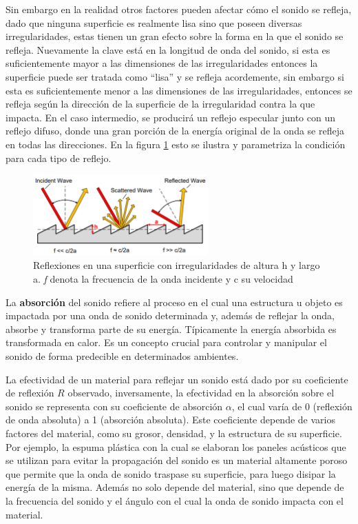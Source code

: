 \documentclass{prgrado}
\begin{document}
Sin embargo en la realidad otros factores pueden afectar cómo el sonido se refleja, dado que ninguna superficie es realmente lisa sino que poseen diversas irregularidades, estas tienen un gran efecto sobre la forma en la que el sonido se refleja. Nuevamente la clave está en la longitud de onda del sonido, si esta es suficientemente mayor a las dimensiones de las irregularidades entonces la superficie puede ser tratada como “lisa” y se refleja acordemente, sin embargo si esta es suficientemente menor a las dimensiones de las irregularidades, entonces se refleja según la dirección de la superficie de la irregularidad contra la que impacta. En el caso intermedio, se producirá un reflejo especular junto con un reflejo difuso, donde una gran porción de la energía original de la onda se refleja en todas las direcciones. En la figura \ref{fig:refleccion} esto se ilustra y parametriza la condición para cada tipo de reflejo.

\begin{figure}[h!]
    \centering
    \includegraphics[width=0.6\textwidth]{figs/wave-reflexion.png}
    \captionsetup{justification=centering}
    \caption{Reflexiones en una superficie con irregularidades de altura h y largo a. \newline\textit{f} denota la frecuencia de la onda incidente y c su velocidad}
    \label{fig:refleccion}
\end{figure}

La \textbf{absorción} del sonido refiere al proceso en el cual una estructura u objeto es impactada por una onda de sonido determinada y, además de reflejar la onda, absorbe y transforma parte de su energía. Típicamente la energía absorbida es transformada en calor. Es un concepto crucial para controlar y manipular el sonido de forma predecible en determinados ambientes.

La efectividad de un material para reflejar un sonido está dado por su coeficiente de reflexión $R$ observado, inversamente, la efectividad en la absorción sobre el sonido se representa con su coeficiente de absorción $\alpha$, el cual varía de 0 (reflexión de onda absoluta) a 1 (absorción absoluta). Este coeficiente depende de varios factores del material, como su grosor, densidad, y la estructura de su superficie. Por ejemplo, la espuma plástica con la cual se elaboran los paneles acústicos que se utilizan para evitar la propagación del sonido es un material altamente poroso que permite que la onda de sonido traspase su superficie, para luego disipar la energía de la misma. Además no solo depende del material, sino que depende de la frecuencia del sonido y el ángulo con el cual la onda de sonido impacta con el material.
\end{document}
